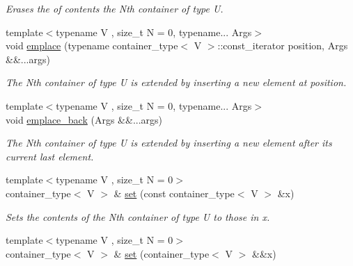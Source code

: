 \begin{DoxyCompactItemize}
\begin{DoxyCompactList}\small\item\em Erases the of contents the Nth container of type U. \end{DoxyCompactList}\item 
\hypertarget{classheterogeneous_1_1heterovector_3_01_t_01_4_a9547ec4128d1145fa12bf03097008e7c}{}{\footnotesize template$<$typename V , size\+\_\+t N = 0, typename... Args$>$ }\\void \hyperlink{classheterogeneous_1_1heterovector_3_01_t_01_4_a9547ec4128d1145fa12bf03097008e7c}{emplace} (typename container\+\_\+type$<$ V $>$\+::const\+\_\+iterator position, Args \&\&...args)\label{classheterogeneous_1_1heterovector_3_01_t_01_4_a9547ec4128d1145fa12bf03097008e7c}

\begin{DoxyCompactList}\small\item\em The Nth container of type U is extended by inserting a new element at position. \end{DoxyCompactList}\item 
\hypertarget{classheterogeneous_1_1heterovector_3_01_t_01_4_a376bdd1c655c10ebb1bc7fa1a0013294}{}{\footnotesize template$<$typename V , size\+\_\+t N = 0, typename... Args$>$ }\\void \hyperlink{classheterogeneous_1_1heterovector_3_01_t_01_4_a376bdd1c655c10ebb1bc7fa1a0013294}{emplace\+\_\+back} (Args \&\&...args)\label{classheterogeneous_1_1heterovector_3_01_t_01_4_a376bdd1c655c10ebb1bc7fa1a0013294}

\begin{DoxyCompactList}\small\item\em The Nth container of type U is extended by inserting a new element after its current last element. \end{DoxyCompactList}\item 
\hypertarget{classheterogeneous_1_1heterovector_3_01_t_01_4_a44134f39ac68cbfdde1605001d1dd752}{}{\footnotesize template$<$typename V , size\+\_\+t N = 0$>$ }\\container\+\_\+type$<$ V $>$ \& \hyperlink{classheterogeneous_1_1heterovector_3_01_t_01_4_a44134f39ac68cbfdde1605001d1dd752}{set} (const container\+\_\+type$<$ V $>$ \&x)\label{classheterogeneous_1_1heterovector_3_01_t_01_4_a44134f39ac68cbfdde1605001d1dd752}

\begin{DoxyCompactList}\small\item\em Sets the contents of the Nth container of type U to those in x. \end{DoxyCompactList}\item 
\hypertarget{classheterogeneous_1_1heterovector_3_01_t_01_4_ab705c87f998f9d519ae4fb57e8dd6a5a}{}{\footnotesize template$<$typename V , size\+\_\+t N = 0$>$ }\\container\+\_\+type$<$ V $>$ \& \hyperlink{classheterogeneous_1_1heterovector_3_01_t_01_4_ab705c87f998f9d519ae4fb57e8dd6a5a}{set} (container\+\_\+type$<$ V $>$ \&\&x)\label{classheterogeneous_1_1heterovector_3_01_t_01_4_ab705c87f998f9d519ae4fb57e8dd6a5a}


\end{DoxyCompactItemize}
